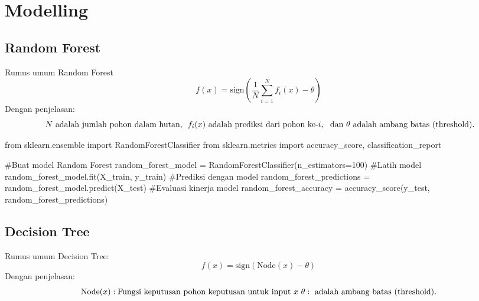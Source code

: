 \documentclass[
  letterpaper,
]{krantz}
\makeatletter
\newenvironment{Shaded}{\begin{snugshade}}{\end{snugshade}}
\newcommand{\CommentTok}[1]{\textcolor[rgb]{0.37,0.37,0.37}{#1}}
\newcommand{\DecValTok}[1]{\textcolor[rgb]{0.68,0.00,0.00}{#1}}
\newcommand{\ImportTok}[1]{\textcolor[rgb]{0.00,0.46,0.62}{#1}}
\newcommand{\NormalTok}[1]{\textcolor[rgb]{0.00,0.23,0.31}{#1}}
\newcommand{\OperatorTok}[1]{\textcolor[rgb]{0.37,0.37,0.37}{#1}}
\newenvironment{kframe}{%
\medskip{}
\setlength{\fboxsep}{.8em}
 \def\at@end@of@kframe{}%
 \ifinner\ifhmode%
  \def\at@end@of@kframe{\end{minipage}}%
  \begin{minipage}{\columnwidth}%
 \fi\fi%
 \def\FrameCommand##1{\hskip\@totalleftmargin \hskip-\fboxsep
 \colorbox{shadecolor}{##1}\hskip-\fboxsep
     \hskip-\linewidth \hskip-\@totalleftmargin \hskip\columnwidth}%
 \MakeFramed {\advance\hsize-\width
   \@totalleftmargin\z@ \linewidth\hsize
   \@setminipage}}%
 {\par\unskip\endMakeFramed%
 \at@end@of@kframe}
\renewenvironment{Shaded}{\begin{kframe}}{\end{kframe}}
\makeatother
\begin{document}
\hypertarget{modelling}{%
\section{Modelling}\label{modelling}}

\hypertarget{random-forest}{%
\subsection{Random Forest}\label{random-forest}}

Rumus umum Random Forest
\[f(x) = \text{sign}\left(\frac{1}{N} \sum_{i=1}^{N} f_i(x) - \theta\right)
\] Dengan penjelasan:
\[\\\ N \text{ adalah jumlah pohon dalam hutan, } \\\ f_i(x) \text{ adalah prediksi dari pohon ke-} i,\\\ \text{ dan } \theta \text{ adalah ambang batas (threshold).}\]

\begin{Shaded}
\begin{Highlighting}[]
\ImportTok{from}\NormalTok{ sklearn.ensemble }\ImportTok{import}\NormalTok{ RandomForestClassifier}
\ImportTok{from}\NormalTok{ sklearn.metrics }\ImportTok{import}\NormalTok{ accuracy\_score, classification\_report}


\CommentTok{\#Buat model Random Forest}
\NormalTok{random\_forest\_model }\OperatorTok{=}\NormalTok{ RandomForestClassifier(n\_estimators}\OperatorTok{=}\DecValTok{100}\NormalTok{)}
\CommentTok{\#Latih model}
\NormalTok{random\_forest\_model.fit(X\_train, y\_train)}
\CommentTok{\#Prediksi dengan model}
\NormalTok{random\_forest\_predictions }\OperatorTok{=}\NormalTok{ random\_forest\_model.predict(X\_test)}
\CommentTok{\#Evaluasi kinerja model}
\NormalTok{random\_forest\_accuracy }\OperatorTok{=}\NormalTok{ accuracy\_score(y\_test, random\_forest\_predictions)}
\end{Highlighting}
\end{Shaded}

\hypertarget{decision-tree}{%
\subsection{Decision Tree}\label{decision-tree}}

Rumus umum Decision Tree: \[
f(x) = \text{sign}\left(\text{Node}(x) - \theta\right)
\] Dengan penjelasan: \[
\text{Node}(x):\text{Fungsi keputusan pohon keputusan untuk input } x
\\\ \theta: \text{ adalah ambang batas (threshold).}
\]
\end{document}
